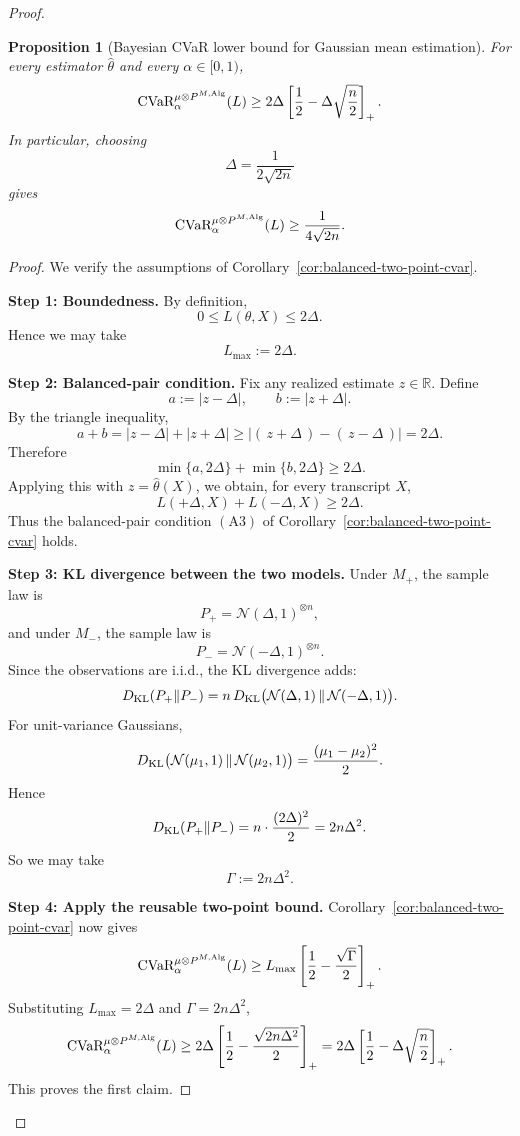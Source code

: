 \documentclass[conference]{IEEEtran}
\newtheorem{proposition}{Proposition}
\begin{document}
\begin{proof}[Proof]
\begin{proposition}[Bayesian \textup{CVaR} lower bound for Gaussian mean estimation]
\label{prop:gaussian-mean-cvar}
For every estimator \(\widehat{\theta}\) and every \(\alpha\in[0,1)\),
\[
\textup{CVaR}_\alpha^{\mu\otimes P^{M,\textup{Alg}}}(L)
\ge
2\Delta\left[\frac12-\Delta\sqrt{\frac{n}{2}}\right]_+.
\]
In particular, choosing
\[
\Delta=\frac{1}{2\sqrt{2n}}
\]
gives
\[
\textup{CVaR}_\alpha^{\mu\otimes P^{M,\textup{Alg}}}(L)
\ge
\frac{1}{4\sqrt{2n}}.
\]
\end{proposition}

\begin{proof}
We verify the assumptions of Corollary~\ref{cor:balanced-two-point-cvar}.

\medskip
\noindent
\textbf{Step 1: Boundedness.}
By definition,
\[
0\le L(\theta,X)\le 2\Delta.
\]
Hence we may take
\[
L_{\max}:=2\Delta.
\]

\medskip
\noindent
\textbf{Step 2: Balanced-pair condition.}
Fix any realized estimate \(z\in\mathbb{R}\). Define
\[
a:=|z-\Delta|,
\qquad
b:=|z+\Delta|.
\]
By the triangle inequality,
\[
a+b = |z-\Delta|+|z+\Delta| \ge |(\,z+\Delta\,)-(\,z-\Delta\,)|=2\Delta.
\]
Therefore
\[
\min\{a,2\Delta\}+\min\{b,2\Delta\}\ge 2\Delta.
\]
Applying this with \(z=\widehat{\theta}(X)\), we obtain, for every transcript \(X\),
\[
L(+\Delta,X)+L(-\Delta,X)\ge 2\Delta.
\]
Thus the balanced-pair condition \((\mathrm{A3})\) of Corollary~\ref{cor:balanced-two-point-cvar} holds.

\medskip
\noindent
\textbf{Step 3: KL divergence between the two models.}
Under \(M_+\), the sample law is
\[
P_+ = \mathcal{N}(\Delta,1)^{\otimes n},
\]
and under \(M_-\), the sample law is
\[
P_- = \mathcal{N}(-\Delta,1)^{\otimes n}.
\]
Since the observations are i.i.d., the KL divergence adds:
\[
D_{\textup{KL}}(P_+\|P_-)
=
n\,D_{\textup{KL}}\bigl(\mathcal{N}(\Delta,1)\,\|\,\mathcal{N}(-\Delta,1)\bigr).
\]
For unit-variance Gaussians,
\[
D_{\textup{KL}}\bigl(\mathcal{N}(\mu_1,1)\,\|\,\mathcal{N}(\mu_2,1)\bigr)
=
\frac{(\mu_1-\mu_2)^2}{2}.
\]
Hence
\[
D_{\textup{KL}}(P_+\|P_-)
=
n\cdot \frac{(2\Delta)^2}{2}
=
2n\Delta^2.
\]
So we may take
\[
\Gamma:=2n\Delta^2.
\]

\medskip
\noindent
\textbf{Step 4: Apply the reusable two-point bound.}
Corollary~\ref{cor:balanced-two-point-cvar} now gives
\[
\textup{CVaR}_\alpha^{\mu\otimes P^{M,\textup{Alg}}}(L)
\ge
L_{\max}\left[\frac12-\frac{\sqrt{\Gamma}}{2}\right]_+.
\]
Substituting \(L_{\max}=2\Delta\) and \(\Gamma=2n\Delta^2\),
\[
\textup{CVaR}_\alpha^{\mu\otimes P^{M,\textup{Alg}}}(L)
\ge
2\Delta\left[\frac12-\frac{\sqrt{2n\Delta^2}}{2}\right]_+
=
2\Delta\left[\frac12-\Delta\sqrt{\frac{n}{2}}\right]_+.
\]
This proves the first claim.


\end{proof}
\end{proof}
\end{document}

